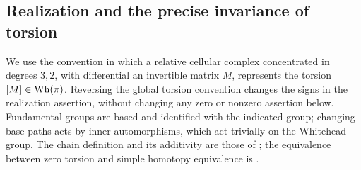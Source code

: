 \subsection{Realization and the precise invariance of torsion}
We use the convention in which a relative cellular complex concentrated
in degrees $3,2$, with differential an invertible matrix $M$, represents
the torsion $[M]\in\operatorname{Wh}(\pi)$. Reversing the global torsion convention
changes the signs in the realization assertion, without changing any
zero or nonzero assertion below. Fundamental groups are based and
identified with the indicated group; changing base paths acts by inner
automorphisms, which act trivially on the Whitehead group.
The chain definition and its additivity are those of
\cite[Definitions~12 and~17, Exercise~14]{I_LurieWhiteheadI};
the equivalence between zero torsion and simple homotopy equivalence
is \cite[Corollary~5 and Theorem~8]{I_LurieWhiteheadII}.

